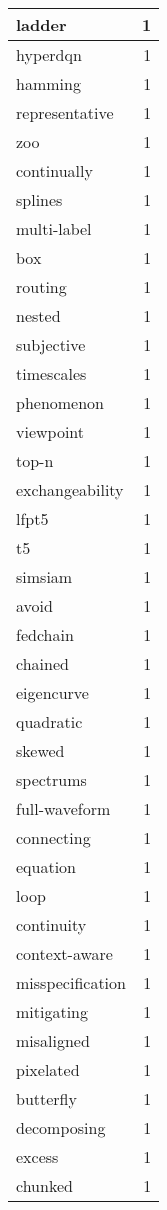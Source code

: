\begin{table}[h]
\begin{tabular}{|l|r|}
\hline
ladder & 1 \\
\hline
hyperdqn & 1 \\
\hline
hamming & 1 \\
\hline
representative & 1 \\
\hline
zoo & 1 \\
\hline
continually & 1 \\
\hline
splines & 1 \\
\hline
multi-label & 1 \\
\hline
box & 1 \\
\hline
routing & 1 \\
\hline
nested & 1 \\
\hline
subjective & 1 \\
\hline
timescales & 1 \\
\hline
phenomenon & 1 \\
\hline
viewpoint & 1 \\
\hline
top-n & 1 \\
\hline
exchangeability & 1 \\
\hline
lfpt5 & 1 \\
\hline
t5 & 1 \\
\hline
simsiam & 1 \\
\hline
avoid & 1 \\
\hline
fedchain & 1 \\
\hline
chained & 1 \\
\hline
eigencurve & 1 \\
\hline
quadratic & 1 \\
\hline
skewed & 1 \\
\hline
spectrums & 1 \\
\hline
full-waveform & 1 \\
\hline
connecting & 1 \\
\hline
equation & 1 \\
\hline
loop & 1 \\
\hline
continuity & 1 \\
\hline
context-aware & 1 \\
\hline
misspecification & 1 \\
\hline
mitigating & 1 \\
\hline
misaligned & 1 \\
\hline
pixelated & 1 \\
\hline
butterfly & 1 \\
\hline
decomposing & 1 \\
\hline
excess & 1 \\
\hline
chunked & 1 \\

\end{tabular}
\end{table}
